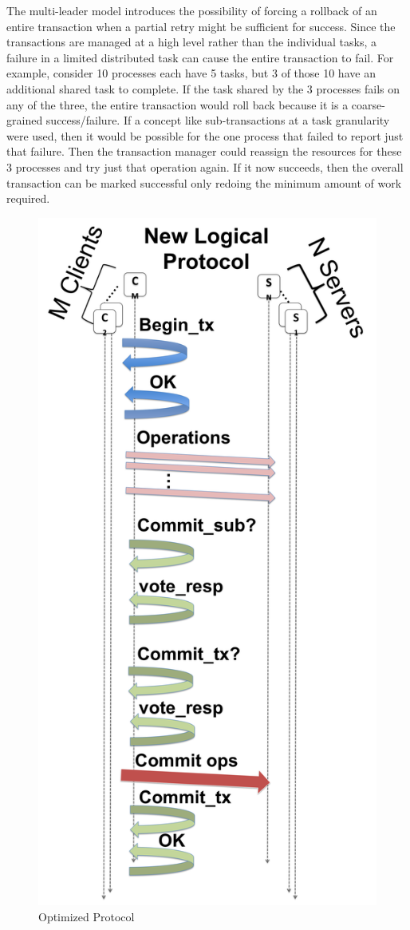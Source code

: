 \documentclass[conference]{IEEEtran}
\begin{document}
The multi-leader model introduces the possibility of forcing a rollback of an
entire transaction when a partial retry might be sufficient for success. Since
the transactions are managed at a high level rather than the individual
tasks, a failure in a limited distributed task can cause the entire transaction
to fail. For example, consider 10 processes each have 5 tasks, but 3 of those
10 have an additional shared task to complete. If the task shared by the 3
processes fails on any of the three, the entire transaction would roll back
because it is a coarse-grained success/failure. If a concept like
sub-transactions at a task granularity were used, then it would be possible for
the one process that failed to report just that failure. Then the transaction
manager could reassign the resources for these 3 processes and try just that
operation again. If it now succeeds, then the overall transaction can be marked
successful only redoing the minimum amount of work required.

\begin{figure}[ht]
\centering
\includegraphics[keepaspectratio=true, width=0.5\columnwidth]{images/optimized-protocol}
\vspace{-0.15in}
\caption{Optimized Protocol}
\label{fig:optimized-protocol}
\end{figure}
\end{document}
